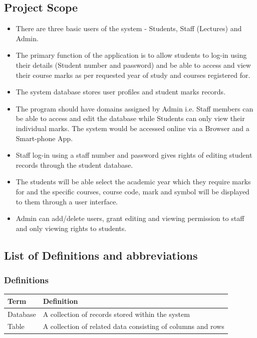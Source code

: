 \documentclass[10pt,onecolumn]{lab}
\begin{document}
\subsection{Project Scope}
\begin{itemize}

\item There are three basic users of the system - Students,  Staff (Lectures) and Admin.
\item The primary function of the application is to allow students to log-in using their details (Student number and password) and be able to access and view their course marks as per requested year of study and courses registered for.
\item The system database stores user profiles and student marks records.
\item The program should have domains assigned by Admin i.e. Staff members can be able to access and edit the database while Students can only view their individual marks. The system would be accessed online via a Browser and a Smart-phone App.
\item Staff log-in using a staff number and password gives rights of editing student records through the student database.
\item The students will be able select the academic year which they require marks for and the specific courses, course code, mark and symbol will be
 displayed to them through a user interface.
\item Admin can add/delete users, grant editing and viewing permission to staff and only viewing rights to students.  

\end{itemize}
\subsection{List of Definitions and abbreviations}

\subsubsection{Definitions}
\begin{center}
    \begin{tabular}{ | p{3cm} | p{9cm} |}
\hline
\textbf{Term}& \textbf{Definition}\\ \hline
 Database & A collection of records stored within the system \\ \hline
 Table & A collection of related data consisting of columns and rows \\ \hline   
     \end{tabular}
\end{center}
\end{document}
